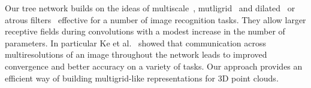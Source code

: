 Our tree network builds on the ideas of multiscale~\cite{he2014spatial,lin2016fpn}, mutligrid~\cite{multigrid} and dilated~\cite{yu2015multi} or atrous filters~\cite{dutilleux1990implementation,chen2016deeplab} effective for a number of image recognition tasks. 
They allow larger receptive fields during convolutions with a modest increase in the number of parameters.
In particular Ke et al.~\cite{multigrid} showed that communication across multiresolutions of an image throughout the network leads to improved convergence and better accuracy on a variety of tasks.
Our approach provides an efficient way of building multigrid-like representations for 3D point clouds.


